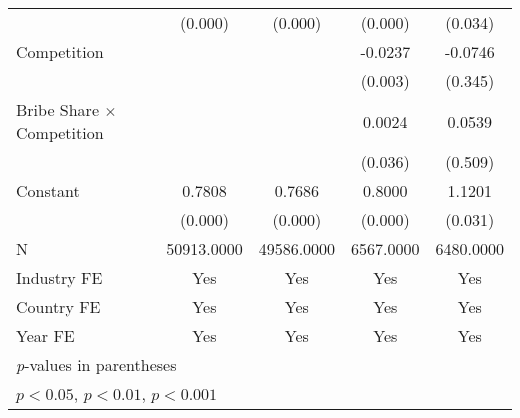 {\begin{tabular}{l*{4}{c}}
                    &     (0.000)         &     (0.000)         &     (0.000)         &     (0.034)         \\
Competition         &                     &                     &     -0.0237\sym{**} &     -0.0746         \\
                    &                     &                     &     (0.003)         &     (0.345)         \\
Bribe Share $\times$ Competition&                     &                     &      0.0024\sym{*}  &      0.0539         \\
                    &                     &                     &     (0.036)         &     (0.509)         \\
Constant            &      0.7808\sym{***}&      0.7686\sym{***}&      0.8000\sym{***}&      1.1201\sym{*}  \\
                    &     (0.000)         &     (0.000)         &     (0.000)         &     (0.031)         \\
\hline
N                   &  50913.0000         &  49586.0000         &   6567.0000         &   6480.0000         \\
Industry FE         &         Yes         &         Yes         &         Yes         &         Yes         \\
Country FE          &         Yes         &         Yes         &         Yes         &         Yes         \\
Year FE             &         Yes         &         Yes         &         Yes         &         Yes         \\
\hline\hline
\multicolumn{5}{l}{\footnotesize \textit{p}-values in parentheses}\\
\multicolumn{5}{l}{\footnotesize \sym{*} \(p<0.05\), \sym{**} \(p<0.01\), \sym{***} \(p<0.001\)}\\
\end{tabular}
}

